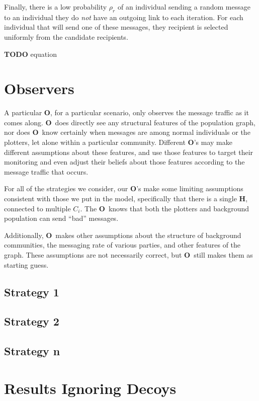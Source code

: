 \documentclass{article}
\newcommand{\Hub}[0]{\ensuremath{\mathbf{H}}}
\newcommand{\Obs}[0]{\ensuremath{\mathbf{O}}}
\begin{document}
Finally, there is a low probability $\rho_r$ of an individual sending a random message to an individual they do {\em not} have an outgoing link to each iteration. For each individual that will send one of these messages, they recipient is selected uniformly from the candidate recipients.

{\bf TODO} equation

\section*{Observers}
A particular \Obs, for a particular scenario, only observes the message traffic as it comes along.  \Obs\ does directly see any structural features of the population graph, nor does \Obs\ know certainly when messages are among normal individuals or the plotters, let alone within a particular community.  Different \Obs's may make different assumptions about these features, and use those features to target their monitoring and even adjust their beliefs about those features according to the message traffic that occurs.

For all of the strategies we consider, our \Obs's make some limiting assumptions consistent with those we put in the model, specifically that there is a single \Hub, connected to multiple $C_i$.  The \Obs\ knows that both the plotters and background population can send ``bad'' messages.

Additionally, \Obs\ makes other assumptions about the structure of background communities, the messaging rate of various parties, and other features of the graph.  These assumptions are not necessarily correct, but \Obs\ still makes them as starting guess.

\subsection*{Strategy 1}

\subsection*{Strategy 2}

\subsection*{Strategy n}

\section*{Results Ignoring Decoys}
\end{document}
